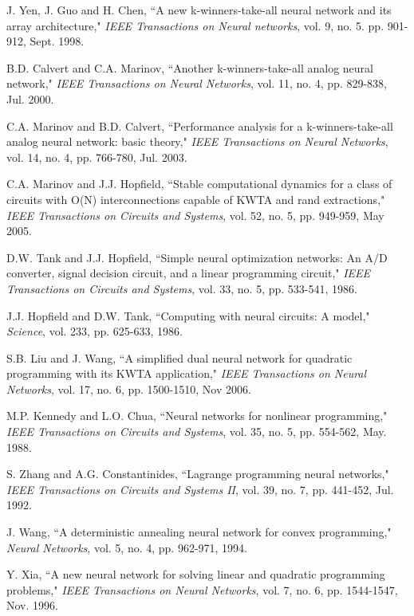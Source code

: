 \documentclass[conference]{IEEEtran}
\begin{document}
\begin{thebibliography}{1}
 J. Yen, J. Guo and H. Chen, ``A new k-winners-take-all neural network and its array architecture,"
        {\it IEEE Transactions on Neural networks}, vol. 9, no. 5. pp. 901-912, Sept. 1998.

 B.D. Calvert and C.A. Marinov, ``Another k-winners-take-all analog neural network,"
        {\it IEEE Transactions on Neural Networks}, vol. 11, no. 4, pp. 829-838, Jul. 2000.

 C.A. Marinov and B.D. Calvert, ``Performance analysis for a k-winners-take-all analog neural network: basic theory,"
        {\it IEEE Transactions on Neural Networks}, vol. 14, no. 4, pp. 766-780, Jul. 2003.

 C.A. Marinov and J.J. Hopfield, ``Stable computational dynamics for a class of circuits with O(N) interconnections capable of KWTA and rand extractions,"
        {\it IEEE Transactions on Circuits and Systems}, vol. 52, no. 5, pp. 949-959, May 2005.

 D.W. Tank and J.J. Hopfield, ``Simple neural optimization networks: An A/D converter, signal decision circuit, and a linear programming circuit,"
        {\it IEEE Transactions on Circuits and Systems}, vol. 33, no. 5, pp. 533-541, 1986.

 J.J. Hopfield and D.W. Tank, ``Computing with neural circuits: A model,"
        {\it Science}, vol. 233, pp. 625-633, 1986.



 S.B. Liu and J. Wang, ``A simplified dual neural network for quadratic programming with its KWTA application,"
        {\it IEEE Transactions on Neural Networks}, vol. 17, no. 6, pp. 1500-1510, Nov 2006.



 M.P. Kennedy and L.O. Chua, ``Neural networks for nonlinear programming,"
        {\it IEEE Transactions on Circuits and Systems}, vol. 35, no. 5, pp. 554-562, May. 1988.

 S. Zhang and A.G. Constantinides, ``Lagrange programming neural networks,"
        {\it IEEE Transactions on Circuits and Systems II}, vol. 39, no. 7, pp. 441-452, Jul. 1992.

 J. Wang, ``A deterministic annealing neural network for convex programming,"
        {\it Neural Networks}, vol. 5, no. 4, pp. 962-971, 1994.

 Y. Xia, ``A new neural network for solving linear and quadratic programming problems,"
        {\it IEEE Transactions on Neural Networks}, vol. 7, no. 6, pp. 1544-1547, Nov. 1996.


\end{thebibliography}
\end{document}
